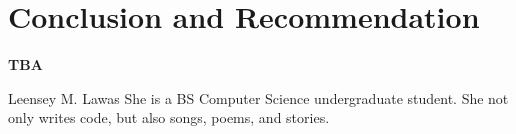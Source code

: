 \documentclass[journal]{IEEE/IEEEtran}
\newcommand{\ADVISEE}{Leensey M. Lawas}
\begin{document}


\section{Conclusion and Recommendation}
\textbf{TBA}






\begin{biography}{\ADVISEE}
She is a BS Computer Science undergraduate student. She not only writes code, but also songs, poems, and stories.
\end{biography}
\end{document}
